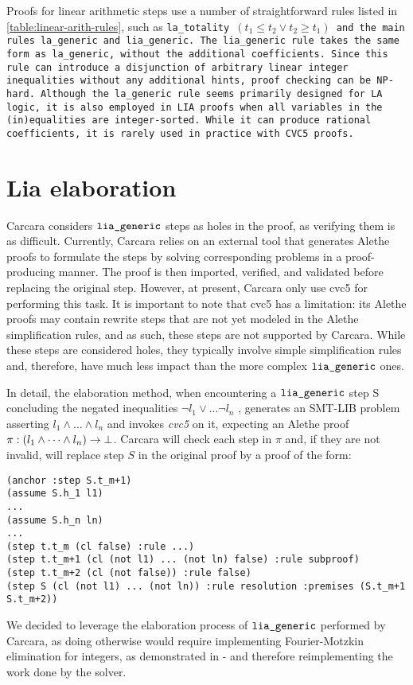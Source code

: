 Proofs for linear arithmetic steps use a number of straightforward rules listed in \cref{table:linear-arith-rules}, such as \tt{la\_totality} $(t_1 \leq t_2 \lor t_2 \geq t_1)$
and the main rules \tt{la\_generic} and \tt{lia\_generic}. The \tt{lia\_generic} rule takes the same form as
\tt{la\_generic}, without the additional coefficients. Since this rule can introduce a disjunction of arbitrary linear integer inequalities without any additional hints, proof checking can be NP-hard.
Although the \tt{la\_generic} rule seems primarily designed for LA logic, it is also employed in LIA proofs when all variables in the (in)equalities are integer-sorted.
While it can produce rational coefficients, it is rarely used in practice with CVC5 proofs.

\section{Lia elaboration}

Carcara considers $\tt{lia\_generic}$ steps as holes in the proof, as verifying them is as difficult.
Currently, Carcara relies on an external tool that generates Alethe proofs to formulate the steps by solving corresponding problems in a proof-producing manner.
The proof is then imported, verified, and validated before replacing the original step.
However, at present, Carcara only use cvc5 for performing this task.
It is important to note that cvc5 has a limitation: its Alethe proofs may contain rewrite steps that are not yet modeled in the Alethe simplification rules, and as such, these steps are not supported by Carcara.
While these steps are considered holes, they typically involve simple simplification rules and, therefore, have much less impact than the more complex $\tt{lia\_generic}$ ones.

In detail, the elaboration method, when encountering a $\tt{lia\_generic}$ step S concluding the negated inequalities $ \neg l_1 \lor \dots \neg l_n$ , generates an SMT-LIB problem asserting $l_1 \land \dots \land l_n$ and invokes \emph{cvc5} on it, expecting an Alethe proof $\pi : (l_1 \land \dots \land l_n) \ra \bot$.
Carcara will check each step in $\pi$ and, if they are not invalid, will replace step $S$ in the original proof by a proof of the form:
\begin{lstlisting}[language=SMT,caption={Elaboration of $\tt{lia\_generic}$},label={lst:smtexampleinput}]
(anchor :step S.t_m+1)
(assume S.h_1 l1)
...
(assume S.h_n ln)
...
(step t.t_m (cl false) :rule ...)
(step t.t_m+1 (cl (not l1) ... (not ln) false) :rule subproof)
(step t.t_m+2 (cl (not false)) :rule false)
(step S (cl (not l1) ... (not ln)) :rule resolution :premises (S.t_m+1 S.t_m+2))
\end{lstlisting}

We decided to leverage the elaboration process of $\tt{lia\_generic}$ performed by Carcara,
as doing otherwise would require implementing Fourier-Motzkin elimination for integers, as demonstrated in \cite{omegatest,micromega} -
and therefore reimplementing the work done by the solver.